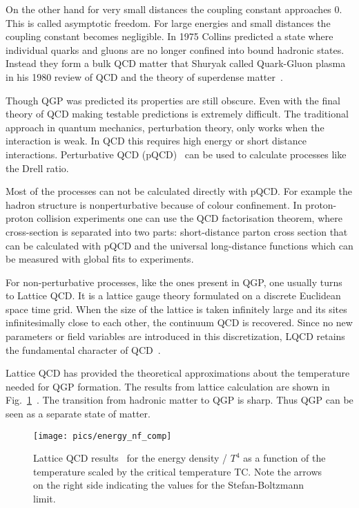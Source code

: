 On the other hand for very small distances the coupling constant approaches 0. This is called asymptotic freedom. For large energies and small distances the coupling constant becomes negligible. In 1975 Collins\cite{Collins:1975} predicted a state where individual quarks and gluons are no longer confined into bound hadronic states. Instead they form a bulk QCD matter that Shuryak called Quark-Gluon plasma in his 1980 review of QCD and the theory of superdense matter~\cite{Shuryak:1980}. 

Though QGP was predicted its properties are still obscure. Even with the final theory of QCD making testable predictions is extremely difficult. The traditional approach in quantum mechanics, perturbation theory, only works when the interaction is weak. In QCD this requires high energy or short distance interactions. Perturbative QCD (pQCD)~\cite{Collins:1989gx} can be used to calculate processes like the Drell ratio.

Most of the processes can not be calculated directly with pQCD. For example the hadron structure is nonperturbative because of colour confinement. %
In proton-proton collision experiments one can use the QCD factorisation theorem, where cross-section is separated into two parts: short-distance parton cross section that can be calculated with pQCD and the universal long-distance functions which can be measured with global fits to experiments.

For non-perturbative processes, like the ones present in QGP, one usually turns to Lattice QCD. It is a lattice gauge theory formulated on a discrete Euclidean space time grid. When the size of the lattice is taken infinitely large and its sites infinitesimally close to each other, the continuum QCD is recovered. Since no new parameters or field variables are introduced in this discretization, LQCD retains the fundamental character of QCD~\cite{Gupta:1997nd}. 

Lattice QCD has provided the theoretical approximations about the temperature needed for QGP formation. The results from lattice calculation are shown in Fig.~\ref{fig:lattice}~\cite{Karsch:2001cy}. The transition from hadronic matter to QGP is sharp. Thus QGP can be seen as a separate state of matter. 

\begin{figure}[htbp]
\centering
\texttt{[image: pics/energy\_nf\_comp]}
\caption[Lattice QCD results]{Lattice QCD results~\cite{Karsch:2001cy} for the energy density / $T^4$ as a function of the temperature scaled by the critical temperature TC. Note the arrows on the right side indicating the values for the Stefan-Boltzmann limit.~\cite{Adcox:2004mh}}
\label{fig:lattice}
\end{figure}

